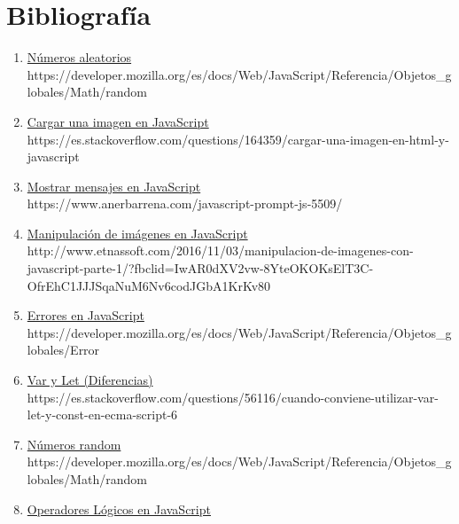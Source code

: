 \documentclass{article}
\begin{document}
\section*{Bibliografía}
\begin{enumerate}
    \item \href{https://developer.mozilla.org/es/docs/Web/JavaScript/Referencia/Objetos_globales/Math/random}{Números aleatorios}\\
    \textsf{https://developer.mozilla.org/es/docs/Web/JavaScript/Referencia/Objetos\_globales/Math/random}
    \item\href{https://es.stackoverflow.com/questions/164359/cargar-una-imagen-en-html-y-javascript}{Cargar una imagen en JavaScript}\\
    \textsf{https://es.stackoverflow.com/questions/164359/cargar-una-imagen-en-html-y-javascript}
    \item \href{https://www.anerbarrena.com/javascript-prompt-js-5509/}{Mostrar mensajes en JavaScript}\\
    \textsf{https://www.anerbarrena.com/javascript-prompt-js-5509/}
    \item \href{http://www.etnassoft.com/2016/11/03/manipulacion-de-imagenes-con-javascript-parte-1/?fbclid=IwAR0dXV2vw-8YteOKOKsElT3C-OfrEhC1JJJSqaNuM6Nv6codJGbA1KrKv80}{Manipulación de imágenes en JavaScript}\\
    \textsf{http://www.etnassoft.com/2016/11/03/manipulacion-de-imagenes-con-javascript-parte-1/?fbclid=IwAR0dXV2vw-8YteOKOKsElT3C-OfrEhC1JJJSqaNuM6Nv6codJGbA1KrKv80}
    \item \href{https://developer.mozilla.org/es/docs/Web/JavaScript/Referencia/Objetos_globales/Error}{Errores en JavaScript}\\
    \textsf{https://developer.mozilla.org/es/docs/Web/JavaScript/Referencia/Objetos\_globales/Error}
    \item \href{https://es.stackoverflow.com/questions/56116/cuando-conviene-utilizar-var-let-y-const-en-ecma-script-6}{Var y Let (Diferencias)}\\
    \textsf{https://es.stackoverflow.com/questions/56116/cuando-conviene-utilizar-var-let-y-const-en-ecma-script-6}
    \item \href{https://developer.mozilla.org/es/docs/Web/JavaScript/Referencia/Objetos_globales/Math/random}{Números random}\\
    \textsf{https://developer.mozilla.org/es/docs/Web/JavaScript/Referencia/Objetos\_globales/Math/random}
    \item \href{https://developer.mozilla.org/es/docs/Web/JavaScript/Referencia/Operadores/Operadores_l\%C3\%B3gicos}{Operadores Lógicos en JavaScript}\\

\end{enumerate}
\end{document}
